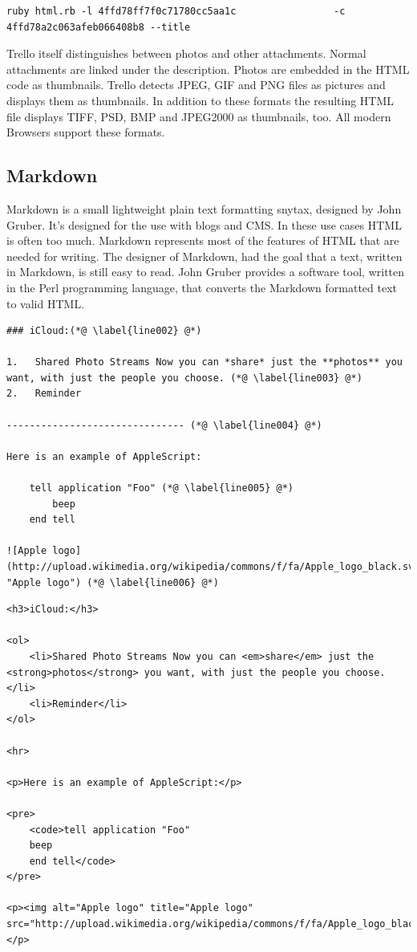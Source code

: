 \begin{lstlisting}[style=bash, float=htb, caption=Example for a \texttt{html.rb} call., label=listing005]
ruby html.rb -l 4ffd78ff7f0c71780cc5aa1c                 -c 4ffd78a2c063afeb066408b8 --title 
\end{lstlisting} 

Trello itself distinguishes between photos and other attachments. Normal attachments are linked under the description. Photos are embedded in the HTML code as thumbnails. Trello detects JPEG, GIF and PNG files as pictures and displays them as thumbnails. In addition to these formats the resulting HTML file displays TIFF, PSD, BMP and JPEG2000 as thumbnails, too. All modern Browsers support these formats.

\subsection{Markdown}
Markdown is a small lightweight plain text formatting snytax, designed by John Gruber. It's designed for the use with blogs and CMS. In these use cases HTML is often too much. Markdown represents most of the features of HTML that are needed for writing. The designer of Markdown, had the goal that a text, written in Markdown, is still easy to read. John Gruber provides a software tool, written in the Perl programming language, that converts the Markdown formatted text to valid HTML. \cite{markdown}

\begin{lstlisting}[style=bash, float=htb, caption=Example for a text written in Markdown., label=listing006]
### iCloud:(*@ \label{line002} @*)

1.   Shared Photo Streams Now you can *share* just the **photos** you want, with just the people you choose. (*@ \label{line003} @*)
2.   Reminder

------------------------------- (*@ \label{line004} @*)

Here is an example of AppleScript:

    tell application "Foo" (*@ \label{line005} @*)
        beep
    end tell

![Apple logo](http://upload.wikimedia.org/wikipedia/commons/f/fa/Apple_logo_black.svg "Apple logo") (*@ \label{line006} @*)
\end{lstlisting}


\begin{lstlisting}[style=html, float=htb, caption=Listing \ref{listing006} converted to HTML., label=listing007]
<h3>iCloud:</h3>

<ol>
	<li>Shared Photo Streams Now you can <em>share</em> just the <strong>photos</strong> you want, with just the people you choose.</li>
	<li>Reminder</li>
</ol>

<hr>

<p>Here is an example of AppleScript:</p>

<pre>
	<code>tell application "Foo"
	beep
	end tell</code>
</pre>

<p><img alt="Apple logo" title="Apple logo" src="http://upload.wikimedia.org/wikipedia/commons/f/fa/Apple_logo_black.svg"></p>
\end{lstlisting} 

